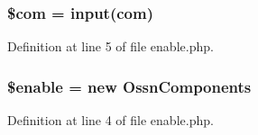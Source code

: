 \subsubsection[{\texorpdfstring{\$com}{$com}}]{\setlength{\rightskip}{0pt plus 5cm}\$com = {\bf input}(\textquotesingle{}com\textquotesingle{})}\hypertarget{component_2enable_8php_aeb238dc1f5c0181fea3117fd9ba0429f}{}\label{component_2enable_8php_aeb238dc1f5c0181fea3117fd9ba0429f}


Definition at line 5 of file enable.\+php.

\subsubsection[{\texorpdfstring{\$enable}{$enable}}]{\setlength{\rightskip}{0pt plus 5cm}\$enable = new {\bf Ossn\+Components}}\hypertarget{component_2enable_8php_abea865f3ca62b18578d7a0ca285d216e}{}\label{component_2enable_8php_abea865f3ca62b18578d7a0ca285d216e}


Definition at line 4 of file enable.\+php.

